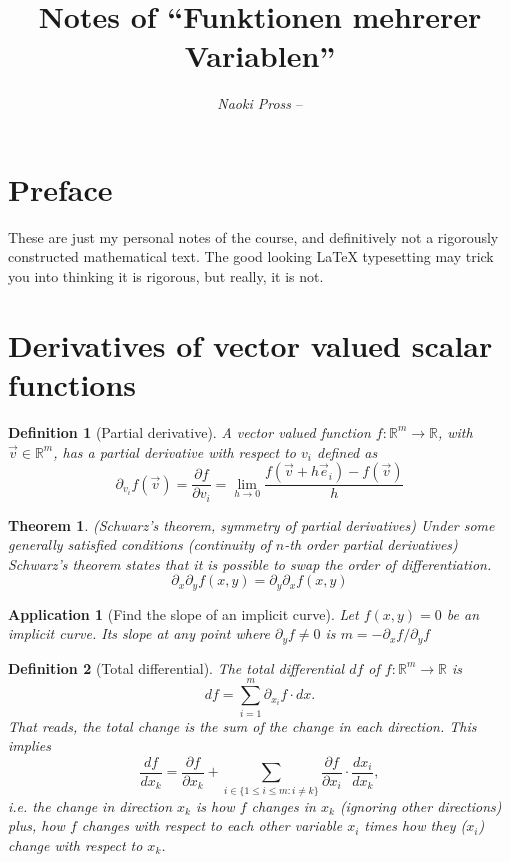 \documentclass[twocolumn, margin=small]{tex/hsrzf}
\author{\textsl{Naoki Pross} -- \texttt{\theauthoremail}}
\title{Notes of ``Funktionen mehrerer Variablen''}
\date{\thesemester}
\theoremstyle{fuvarzf}
\newtheorem{theorem}{Theorem}
\newtheorem{application}{Application}
\newtheorem{definition}{Definition}
\begin{document}
\maketitle

\section{Preface}

These are just my personal notes of the \themodule{} course, and definitively
not a rigorously constructed mathematical text. The good looking \LaTeX{}
typesetting may trick you into thinking it is rigorous, but really, it is not.

\section{Derivatives of vector valued scalar functions}

\begin{definition}[Partial derivative]
  A vector valued function \(f: \mathbb{R}^m\to\mathbb{R}\), with
  \(\vec{v}\in\mathbb{R}^m\), has a partial derivative with respect to \(v_i\)
  defined as
  \[
    \partial_{v_i} f(\vec{v})
      = \frac{\partial f}{\partial v_i}
      = \lim_{h\to 0} \frac{f(\vec{v} + h\vec{e}_i) - f(\vec{v})}{h}
  \]
\end{definition}

\begin{theorem}(Schwarz's theorem, symmetry of partial derivatives)
  Under some generally satisfied conditions (continuity of \(n\)-th order
  partial derivatives) Schwarz's theorem states that it is possible to swap
  the order of differentiation.
  \[
    \partial_x \partial_y f(x,y) = \partial_y \partial_x f(x,y)
  \]
\end{theorem}

\begin{application}[Find the slope of an implicit curve]
  Let \(f(x,y) = 0\) be an implicit curve. Its slope at any point where
  \(\partial_y f \neq 0\) is \(m = - \partial_x f / \partial_y f\)
\end{application}

\begin{definition}[Total differential]
  The total differential \(df\) of \(f:\mathbb{R}^m\to\mathbb{R}\) is
  \[
    df = \sum_{i=1}^m \partial_{x_i} f\cdot dx .
  \]
  That reads, the \emph{total} change is the sum of the change in each
  direction. This implies
  \[
    \frac{df}{dx_k} = \frac{\partial f}{\partial x_k} + 
      \sum_{i \in \{1 \leq i \leq m : i \neq k\}}
      \frac{\partial f}{\partial x_i} \cdot \frac{dx_i}{dx_k} ,
  \]
  i.e. the change in direction \(x_k\) is how \(f\) changes in \(x_k\)
  (ignoring other directions) plus, how \(f\) changes with respect to each
  other variable \(x_i\) times how they (\(x_i\)) change with respect to \(x_k\).
\end{definition}
\end{document}
